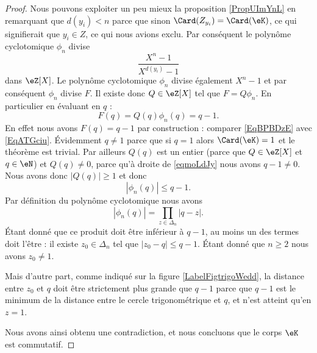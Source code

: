 \begin{proof}
    Nous pouvons exploiter un peu mieux la proposition \ref{PropUImYnL} en remarquant que \( d(y_i)<n\) parce que sinon \( \Card(Z_{y_i})=\Card(\eK)\), ce qui signifierait que \( y_i\in Z\), ce qui nous avions exclu. Par conséquent le polynôme cyclotomique \( \phi_n\) divise 
    \begin{equation}
        \frac{ X^n-1 }{ X^{d(y_i)}-1 }
    \end{equation}
    dans \( \eZ[X]\). Le polynôme cyclotomique \( \phi_n\) divise également \( X^n-1\) et par conséquent \( \phi_n\) divise \( F\). Il existe donc \( Q\in \eZ[X]\) tel que \( F=Q\phi_n\). En particulier en évaluant en \( q\) :
    \begin{equation}    \label{eqmoLdJy}
        F(q)=Q(q)\phi_n(q)=q-1.
    \end{equation}
    En effet nous avons \( F(q)=q-1\) par construction : comparer \eqref{EqBPBDzE} avec \eqref{EqATGciu}. Évidemment \( q\neq 1\) parce que si \( q=1\) alors \( \Card(\eK)=1\) et le théorème est trivial. Par ailleurs \( Q(q)\) est un entier (parce que \( Q\in \eZ[X]\) et \( q\in \eN\)) et \( Q(q)\neq 0\), parce qu'à droite de \eqref{eqmoLdJy} nous avons \( q-1\neq 0\). Nous avons donc \( | Q(q) |\geq 1\) et donc
    \begin{equation}
        | \phi_n(q) |\leq q-1.
    \end{equation}
    Par définition du polynôme cyclotomique nous avons
    \begin{equation}
        | \phi_n(q) |=\prod_{z\in\Delta_n}| q-z |.
    \end{equation}
    Étant donné que ce produit doit être inférieur à \( q-1\), au moins un des termes doit l'être : il existe \( z_0\in \Delta_n\) tel que \( | z_0-q |\leq q-1\). Étant donné que \( n\geq 2\) nous avons \( z_0\neq 1\).

    Mais d'autre part, comme indiqué sur la figure \ref{LabelFigtrigoWedd}, la distance entre \( z_0\) et \( q\) doit être strictement plus grande que \( q-1\) parce que \( q-1\) est le minimum de la distance entre le cercle trigonométrique et \( q\), et n'est atteint qu'en \( z=1\).
    \newcommand{\CaptionFigtrigoWedd}{Nous devons avoir \( | z_0-q |>q-1\).}
    

    Nous avons ainsi obtenu une contradiction, et nous concluons que le corps \( \eK\) est commutatif.
\end{proof}

